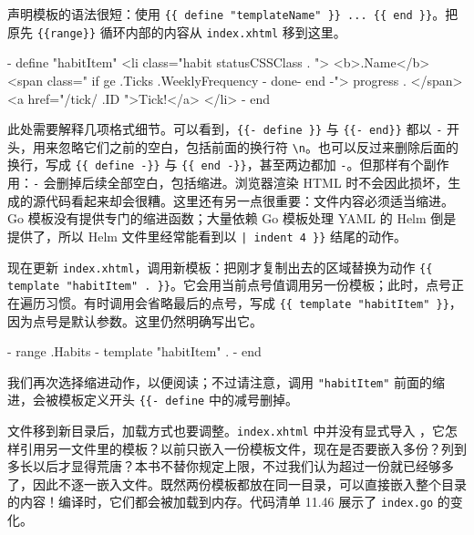 声明模板的语法很短：使用 \texttt{\{\{ define "templateName" \}\} ... \{\{ end \}\}}。把原先 \texttt{\{\{range\}\}} 循环内部的内容从 \texttt{index.xhtml} 移到这里。

\begin{htmlcode}[title={代码清单 11.45 \texttt{habititem.xhtml}：在另一文件中声明模板}]
{{- define "habitItem"}}
        <li class="habit {{ statusCSSClass . }}">
            <b>{{.Name}}</b>
            <span class="{{ if ge .Ticks .WeeklyFrequency -}}
                done{{- end -}}">{{ progress . }}</span>
            <a href="/tick/{{ .ID }}">Tick!</a>
        </li>
{{- end }}
\end{htmlcode}

此处需要解释几项格式细节。可以看到，\texttt{\{\{- define \}\}} 与 \texttt{\{\{- end\}\}} 都以 \texttt{-} 开头，用来忽略它们之前的空白，包括前面的换行符 \texttt{\textbackslash n}。也可以反过来删除后面的换行，写成 \texttt{\{\{ define -\}\}} 与 \texttt{\{\{ end -\}\}}，甚至两边都加 \texttt{-}。但那样有个副作用：\texttt{-} 会删掉后续全部空白，包括缩进。浏览器渲染 HTML 时不会因此损坏，生成的源代码看起来却会很糟。这里还有另一点很重要：文件内容必须适当缩进。Go 模板没有提供专门的缩进函数；大量依赖 Go 模板处理 YAML 的 Helm 倒是提供了，所以 Helm 文件里经常能看到以 \texttt{| indent 4 \}\}} 结尾的动作。

现在更新 \texttt{index.xhtml}，调用新模板：把刚才复制出去的区域替换为动作 \texttt{\{\{ template "habitItem" . \}\}}。它会用当前点号值调用另一份模板；此时，点号正在遍历习惯。有时调用会省略最后的点号，写成 \texttt{\{\{ template "habitItem" \}\}}，因为点号是默认参数。这里仍然明确写出它。

\begin{htmlcode}[]
{{- range .Habits }}
    {{- template "habitItem" . }}
{{- end }}
\end{htmlcode}

我们再次选择缩进动作，以便阅读；不过请注意，调用 \texttt{"habitItem"} 前面的缩进，会被模板定义开头 \texttt{\{\{- define} 中的减号删掉。

文件移到新目录后，加载方式也要调整。\texttt{index.xhtml} 中并没有显式导入 ，它怎样引用另一文件里的模板？以前只嵌入一份模板文件，现在是否要嵌入多份？列到多长以后才显得荒唐？本书不替你规定上限，不过我们认为超过一份就已经够多了，因此不逐一嵌入文件。既然两份模板都放在同一目录，可以直接嵌入整个目录的内容！编译时，它们都会被加载到内存。代码清单 11.46 展示了 \texttt{index.go} 的变化。


